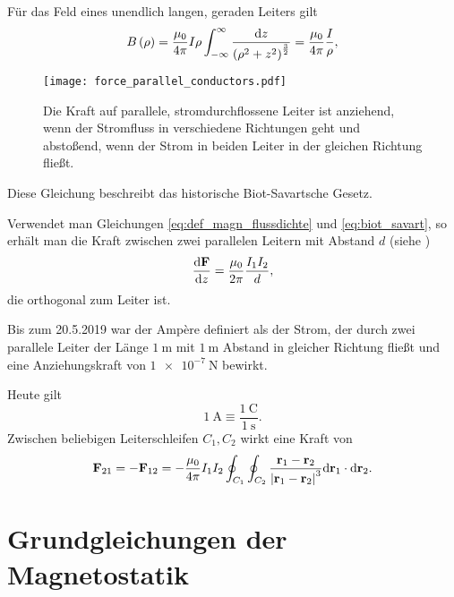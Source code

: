 Für das Feld eines unendlich langen, geraden Leiters gilt
\begin{equation*}
    \label{eq:biot_savart}
	B\left(\rho \right)=\frac{\mu _{0}}{4\pi }I\rho \int _{-\infty }^{\infty }\frac{\text{d} z}{\left(\rho ^{2}+z^{2}\right)^{\frac{3}{2}}}=\frac{\mu _{0}}{4\pi }\frac{I}{\rho },
\end{equation*}


\begin{figure}[htb]
	\centering
	\texttt{[image: force\_parallel\_conductors.pdf]}
	\caption{Die Kraft auf parallele, stromdurchflossene Leiter ist anziehend, wenn der Stromfluss in verschiedene Richtungen geht und abstoßend, wenn der Strom in beiden Leiter in der gleichen Richtung fließt. }
	\label{fig:force_parallel_conductors}
\end{figure}

Diese Gleichung beschreibt das historische Biot-Savartsche Gesetz.

Verwendet man Gleichungen \eqref{eq:def_magn_flussdichte} und \eqref{eq:biot_savart}, so erhält man die Kraft zwischen zwei parallelen Leitern mit Abstand $d$ (siehe )
\begin{equation*}
    \frac{\text{d}\mathbf{F}}{\text{d} z} = \frac{\mu_0}{2\pi} \frac{I_1I_2}d,
\end{equation*}
die orthogonal zum Leiter ist.

Bis zum 20.5.2019 war der Ampère definiert als der Strom, der durch zwei parallele Leiter der Länge $\SI{1}{\m}$ mit $\SI{1}{\m}$ Abstand in gleicher Richtung fließt und eine Anziehungskraft von $\SI{1e-7}{\newton}$ bewirkt. 

Heute gilt
\begin{equation*}
	\SI{1}{\ampere}\equiv \frac{\SI{1}{\coulomb}}{\SI{1}{\s}}.
\end{equation*}
Zwischen beliebigen Leiterschleifen $C_{1},C_{2}$ wirkt eine Kraft von
\begin{equation*}
	\mathbf{F}_{21}=-\mathbf{F}_{12}=-\frac{\mu _{0}}{4\pi }I_{1}I_{2}\oint _{C_{1}}\oint _{C_{2}}\frac{\mathbf{r}_{1}-\mathbf{r}_{2}}{\left| \mathbf{r}_{1}-\mathbf{r}_{2}\right| ^{3}}\text{d} \mathbf{r}_{1}\cdot \text{d} \mathbf{r}_{2}.
\end{equation*}



\section{Grundgleichungen der Magnetostatik}

